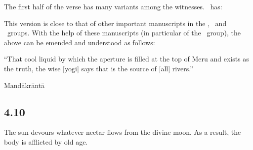\begin{ekdosis}
\begin{philcomm}[hp04_009]
The first half of the verse has many variants among the witnesses. \alphaTwo\ has:
\begin{versinnote}
\end{versinnote}
This version is close to that of other important manuscripts in the \textbeta, \textgamma\ and \texteta\ groups. With the help of these manuscripts (in particular  of the \textgamma\ group), the above can be emended and understood as follows:
\begin{versinnote}
\tl{\var{°suṣiraṃ ] \getsiglum{K1}, °sukhire \alphaTwo. °mūrdhny ] \getsiglum{P8}. °mūle \alphaTwo. asti tathyaṃ ] \getsiglum{K1}, yad astī \alphaTwo.}\\!}
“That cool liquid by which the aperture is filled at the top of Meru and exists as the truth, the wise [yogi] says that is the source of [all] rivers.” 
\end{versinnote}


\end{philcomm}


\begin{metre}[hp04_009]
Mandākrāntā 
\end{metre}

\subsection*{4.10}
\begin{translation}[hp04_010]
The sun devours whatever nectar flows from the divine moon. As a result, the body is afflicted by old age.
\end{translation}


\end{ekdosis}
